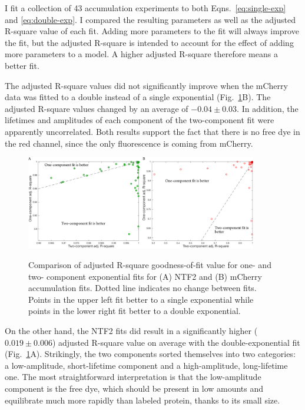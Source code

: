 I fit a collection of 43 accumulation experiments to both Eqns.~\ref{eq:single-exp} and \ref{eq:double-exp}.  I compared the resulting parameters as well as the adjusted R-square value of each fit.  Adding more parameters to the fit will always improve the fit, but the adjusted R-square is intended to account for the effect of adding more parameters to a model.  A higher adjusted R-square therefore means a better fit.

The adjusted R-square values did not significantly improve when the mCherry data was fitted to a double instead of a single exponential (Fig.~\ref{fig:free-dye-gof}B).  The adjusted R-square values changed by an average of $-0.04\pm0.03$.  In addition, the lifetimes and amplitudes of each component of the two-component fit were apparently uncorrelated.  Both results support the fact that there is no free dye in the red channel, since the only fluorescence is coming from mCherry.
\begin{figure} %
\caption[Comparison of single and double exponential fits for free-dye analysis.]{Comparison of adjusted R-square goodness-of-fit value for one- and two- component exponential fits for (A) NTF2 and (B) mCherry accumulation fits.  Dotted line indicates no change between fits.  Points in the upper left fit better to a single exponential while points in the lower right fit better to a double exponential.}
\centering
\includegraphics[width=0.9\textwidth]{figs/ch03/free-dye-gof}
\label{fig:free-dye-gof}
\end{figure} 

On the other hand, the NTF2 fits did result in a significantly higher ($0.019\pm0.006$) adjusted R-square value on average with the double-exponential fit (Fig.~\ref{fig:free-dye-gof}A).  Strikingly, the two components sorted themselves into two categories: a low-amplitude, short-lifetime component and a high-amplitude, long-lifetime one.  The most straightforward interpretation is that the low-amplitude component is the free dye, which should be present in  low amounts and equilibrate much more rapidly than labeled protein, thanks to its small size.

